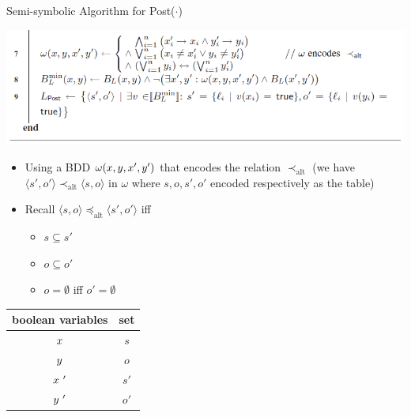 \documentclass[12pt]{beamer}
\begin{document}
\begin{frame}{Semi-symbolic Algorithm for Post($\cdot$)}
	\label{Algorithm1_part2}
	\begin{center}
		\includegraphics[scale=0.5]{Algorithm1_part2}
	\end{center}
	\begin{minipage}{.6\textwidth}
		\begin{itemize}
			\item Using a BDD $\omega (\mathnormal{x}, \mathnormal{y}, \mathnormal{x}', \mathnormal{y}')$ that encodes the relation $\prec_{\text{alt}}$ (we have $\langle s', o' \rangle \prec_{\text{alt}} \langle s, o \rangle$ in $\omega$ where $s, o, s', o'$ encoded respectively as the table)
			\item Recall $\langle s, o \rangle \preceq_{\text{alt}} \langle s', o' \rangle$ iff
			\begin{itemize}
				\item $s \subseteq s'$
				\item $o \subseteq o'$
				\item $o = \emptyset$ iff $o' = \emptyset$
			\end{itemize}
		\end{itemize}
	\end{minipage}%
	\begin{minipage}{.4\textwidth}
		\small
		\centering
		\begin{tabular}{ ||c|c|| } 
			\hline
			boolean variables & set \\
			\hline \hline
			$\mathnormal{x}$ & $s$ \\
			\hline 
			$\mathnormal{y}$ & $o$ \\
			\hline
			$\mathnormal{x}~'$ & $s'$ \\
			\hline
			$\mathnormal{y}~'$ & $o'$ \\ 
			\hline
		\end{tabular}
	\end{minipage}
\end{frame}
\end{document}
